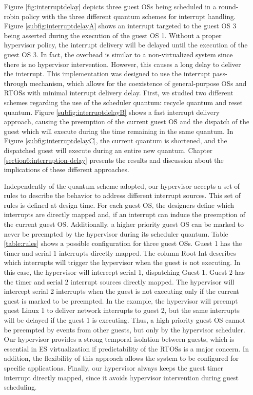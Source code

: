 Figure \ref{fig:interruptdelay} depicts three guest OSs being scheduled in a round-robin policy with the three different quantum schemes for interrupt handling. Figure \ref{subfig:interruptdelayA} shows an interrupt targeted to the guest OS 3 being asserted during the execution of the guest OS 1. Without a proper hypervisor policy, the interrupt delivery will be delayed until the execution of the guest OS 3. In fact, the overhead is similar to a non-virtualized system since there is no hypervisor intervention. However, this causes a long delay to deliver the interrupt. This implementation was designed to use the interrupt pass-through mechanism, which allows for the coexistence of general-purpose OSs and RTOSs with minimal interrupt delivery delay. First, we studied two different schemes regarding the use of the scheduler quantum: recycle quantum and reset quantum. Figure \ref{subfig:interruptdelayB} shows a fast interrupt delivery approach, causing the preemption of the current guest OS and the dispatch of the guest which will execute during the time remaining in the same quantum. In Figure \ref{subfig:interruptdelayC}, the current quantum is shortened, and the dispatched guest will execute during an entire new quantum. Chapter \ref{section6:interruption-delay} presents the results and discussion about the implications of these different approaches. 

Independently of the quantum scheme adopted, our hypervisor accepts a set of rules to describe the behavior to address different interrupt sources. This set of rules is defined at design time. For each guest OS, the designers define which interrupts are directly mapped and, if an interrupt can induce the preemption of the current guest OS. Additionally, a higher priority guest OS can be marked to never be preempted by the hypervisor during its scheduler quantum. Table \ref{table:rules} shows a possible configuration for three guest OSs. Guest 1 has the timer and serial 1 interrupts directly mapped. The column Root Int describes which interrupts will trigger the hypervisor when the guest is not executing. In this case, the hypervisor will intercept serial 1, dispatching Guest 1. Guest 2 has the timer and serial 2 interrupt sources directly mapped. The hypervisor will intercept serial 2 interrupts when the guest is not executing only if the current guest is marked to be preempted. In the example, the hypervisor will preempt guest Linux 1 to deliver network interrupts to guest 2, but the same interrupts will be delayed if the guest 1 is executing. Thus, a high priority guest OS cannot be preempted by events from other guests, but only by the hypervisor scheduler. Our hypervisor provides a strong temporal isolation between guests, which is essential in ES virtualization if predictability of the RTOSs is a major concern. In addition, the flexibility of this approach allows the system to be configured for specific applications. Finally, our hypervisor always keeps the guest timer interrupt directly mapped, since it avoids hypervisor intervention during guest scheduling. 

